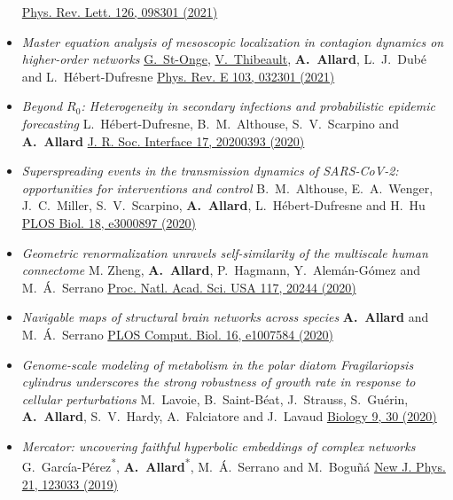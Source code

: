 \documentclass[11pt]{article}
\begin{document}
\begin{itemize}[itemsep=0.5em]
  \href{http://doi.org/10.1103/PhysRevLett.126.098301}{Phys. Rev. Lett. 126, 098301 (2021)}
%
  \item \textit{Master equation analysis of mesoscopic localization in contagion dynamics on higher-order networks}\split
  \uline{G.~St-Onge}, \uline{V.~Thibeault}, \textbf{A.~Allard}, L.~J.~Dub\'e and L.~H\'ebert-Dufresne\split
  \href{http://doi.org/10.1103/PhysRevE.103.032301}{Phys. Rev. E 103, 032301 (2021)}
  \item \textit{Beyond $R_0$: Heterogeneity in secondary infections and probabilistic epidemic forecasting}\split
  L.~H\'ebert-Dufresne, B.~M.~Althouse, S.~V.~Scarpino and \textbf{A.~Allard}\split
  \href{https://doi.org/10.1098/rsif.2020.0393}{J. R. Soc. Interface 17, 20200393 (2020)}
%
  \item \textit{Superspreading events in the transmission dynamics of SARS-CoV-2: opportunities for interventions and control}\split
  B.~M.~Althouse, E.~A.~Wenger, J.~C.~Miller, S.~V.~Scarpino, \textbf{A.~Allard}, L.~H\'ebert-Dufresne and H.~Hu\split
  \href{https://doi.org/10.1371/journal.pbio.3000897}{PLOS Biol. 18, e3000897 (2020)}
%
  \item \textit{Geometric renormalization unravels self-similarity of the multiscale human connectome}\split
  M. Zheng, \textbf{A.~Allard}, P.~Hagmann, Y.~Alem\'an-G\'omez and M.~\'A.~Serrano\split
  \href{http://doi.org/10.1073/pnas.1922248117}{Proc. Natl. Acad. Sci. USA 117, 20244 (2020)}
%
  \item \textit{Navigable maps of structural brain networks across species}\split
  \textbf{A.~Allard} and M.~\'A.~Serrano\split
  \href{https://doi.org/10.1371/journal.pcbi.1007584}{PLOS Comput. Biol. 16, e1007584 (2020)}
  \item \textit{Genome-scale modeling of metabolism in the polar diatom Fragilariopsis cylindrus underscores the strong robustness of growth rate in response to cellular perturbations}\split
  M.~Lavoie, B.~Saint-Béat, J.~Strauss, S.~Guérin, \textbf{A.~Allard}, S.~V.~Hardy, A.~Falciatore and J.~Lavaud\split
  \href{https://doi.org/10.3390/biology9020030}{Biology 9, 30 (2020)}
%
  \item \textit{Mercator: uncovering faithful hyperbolic embeddings of complex networks}\split
  G.~Garc\'ia-P\'erez\textsuperscript{*}, \textbf{A.~Allard}\textsuperscript{*}, M.~\'A.~Serrano and M.~Bogu\~n\'a\split
  \href{https://doi.org/10.1088/1367-2630/ab57d2}{New J. Phys. 21, 123033 (2019)}

\end{itemize}
\end{document}
